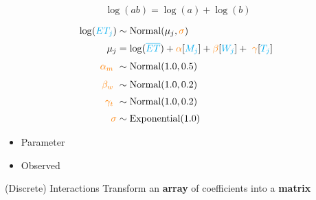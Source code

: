 \documentclass[aspectratio=169,xcolor=svgnames]{beamer}
\begin{document}
\begin{frame}
  \begin{equation*}
    \log(ab) = \log(a) + \log(b)
  \end{equation*}
\end{frame}

\begin{frame}[fragile]
  \begin{align*}
    \log(\observed{ET_j}) &\sim \text{Normal}(\mu_j, \parameter{\sigma})\\
    \mu_j &= \log(\observed{\overline{ET}}) + \parameter{\alpha}[\observed{M_j}] + \parameter{\beta}[\observed{W_j}] + \markmath{arrayaccess}{\parameter{\gamma}[\observed{T_j}]}\\
    \markmath{alpha}{\parameter{\alpha_m}} &\sim \normal{1.0, 0.5}\\
    \markmath{beta}{\parameter{\beta_w}} &\sim \normal{1.0, 0.2}\\
    \markmath{gamma}{\parameter{\gamma_t}} &\sim \normal{1.0, 0.2}\\
    \parameter{\sigma} &\sim \exponential{1.0}\\
  \end{align*}


  \begin{itemize}
  \item {} Parameter
  \item {} Observed
  \end{itemize}
\end{frame}

\begin{frame}
  \begin{block}{(Discrete) Interactions}
    Transform an \textbf{array} of coefficients into a \textbf{matrix}
  \end{block}
\end{frame}
\end{document}
